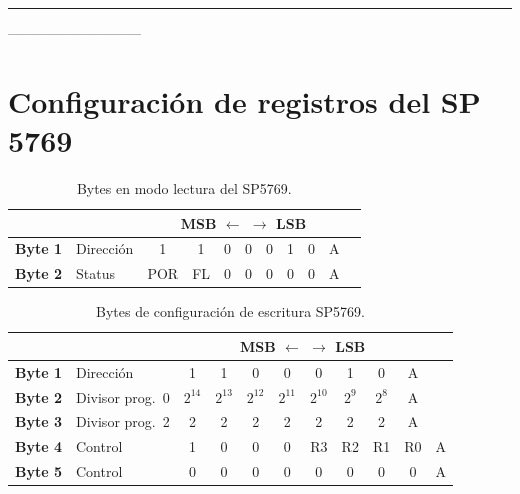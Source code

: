 \documentclass[12pt, a4paper]{article}
\begin{document}
	\noindent\rule{\textwidth}{0.4pt}
-----------------------------
	\section{Configuración de registros del SP\,5769}
	\label{anx:registros}
	
\begin{table}[H]
	\centering
	\caption{Bytes en modo lectura del SP5769.}
	\label{tab:sp5769_lectura}
	\renewcommand{\arraystretch}{1.3}
	\begin{tabular}{llccccccccc}
		\toprule
		& & \multicolumn{8}{c}{\textbf{MSB $\longleftarrow$ \hspace{3cm} $\longrightarrow$ LSB}} & \\
		\midrule
		\textbf{Byte 1} & Dirección & 1 & 1 & 0 & 0 & 0 & 1 & 0 & A \\
		\textbf{Byte 2} & Status    & POR & FL & 0 & 0 & 0 & 0 & 0 & A \\
		\bottomrule
	\end{tabular}
\end{table}

\begin{table}[H]
	\centering
	\caption{Bytes de configuración de escritura SP5769.}
	\label{tab:sp5769_escritura}
	\renewcommand{\arraystretch}{1.3}
	\begin{tabular}{llccccccccc}
		\toprule
		& & \multicolumn{8}{c}{\textbf{MSB $\longleftarrow$ \hspace{3cm} $\longrightarrow$ LSB}} & \\
		\midrule
		\textbf{Byte 1} & Dirección      & 1 & 1 & 0 & 0 & 0 & 1 & 0 & A \\
		\textbf{Byte 2} & Divisor prog.\ 0 & $2^{14}$ & $2^{13}$ & $2^{12}$ & $2^{11}$ & $2^{10}$ & $2^{9}$ & $2^{8}$ & A \\
		\textbf{Byte 3} & Divisor prog.\ 2 & 2 & 2 & 2 & 2 & 2 & 2 & 2 & A \\
		\textbf{Byte 4} & Control        & 1 & 0 & 0 & 0 & R3 & R2 & R1 & R0 & A \\
		\textbf{Byte 5} & Control        & 0 & 0 & 0 & 0 & 0 & 0 & 0 & 0 & A \\
		\bottomrule
	\end{tabular}
\end{table}
\end{document}
